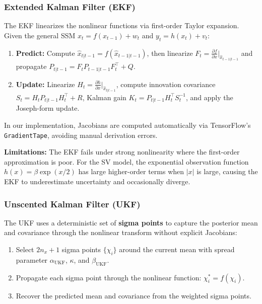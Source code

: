 \documentclass[12pt,a4paper]{article}
\theoremstyle{definition}
\theoremstyle{remark}
\begin{document}
\subsubsection{Extended Kalman Filter (EKF)}

The EKF linearizes the nonlinear functions via first-order Taylor expansion. Given the general SSM $x_t = f(x_{t-1}) + w_t$ and $y_t = h(x_t) + v_t$:

\begin{enumerate}
	\item \textbf{Predict:} Compute $\hat{x}_{t|t-1} = f(\hat{x}_{t-1|t-1})$, then linearize $F_t = \frac{\partial f}{\partial x}\big|_{\hat{x}_{t-1|t-1}}$ and propagate $P_{t|t-1} = F_t P_{t-1|t-1} F_t^\top + Q$.
	\item \textbf{Update:} Linearize $H_t = \frac{\partial h}{\partial x}\big|_{\hat{x}_{t|t-1}}$, compute innovation covariance $S_t = H_t P_{t|t-1} H_t^\top + R$, Kalman gain $K_t = P_{t|t-1} H_t^\top S_t^{-1}$, and apply the Joseph-form update.
\end{enumerate}

In our implementation, Jacobians are computed automatically via TensorFlow's \texttt{GradientTape}, avoiding manual derivation errors.

\textbf{Limitations:} The EKF fails under strong nonlinearity where the first-order approximation is poor. For the SV model, the exponential observation function $h(x) = \beta \exp(x/2)$ has large higher-order terms when $|x|$ is large, causing the EKF to underestimate uncertainty and occasionally diverge.

\subsubsection{Unscented Kalman Filter (UKF)}

The UKF uses a deterministic set of \textbf{sigma points} to capture the posterior mean and covariance through the nonlinear transform without explicit Jacobians:

\begin{enumerate}
	\item Select $2n_x + 1$ sigma points $\{\chi_i\}$ around the current mean with spread parameter $\alpha_\text{UKF}$, $\kappa$, and $\beta_\text{UKF}$.
	\item Propagate each sigma point through the nonlinear function: $\chi_i^* = f(\chi_i)$.
	\item Recover the predicted mean and covariance from the weighted sigma points.
\end{enumerate}
\end{document}
